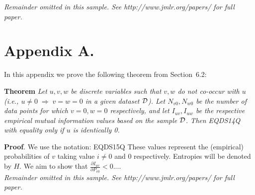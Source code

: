 \documentclass[twoside,11pt]{article}
\begin{document}
{\noindent \em Remainder omitted in this sample. See http://www.jmlr.org/papers/ for full paper.}


\newpage

\appendix
\section*{Appendix A.}
\label{app:theorem}

In this appendix we prove the following theorem from
Section~6.2:

\noindent
{\bf Theorem} {\it Let $u,v,w$ be discrete variables such that $v, w$ do
not co-occur with $u$ (i.e., $u\neq0\;\Rightarrow \;v=w=0$ in a given
dataset ${{\cal D}}$). Let $N_{v0},N_{w0}$ be the number of data points for
which $v=0, w=0$ respectively, and let $I_{uv},I_{uw}$ be the
respective empirical mutual information values based on the sample
${{\cal D}}$. Then
EQDS14Q
with equality only if $u$ is identically 0.} \hfill\BlackBox

\noindent
{\bf Proof}. We use the notation:
EQDS15Q
These values represent the (empirical) probabilities of $v$
taking value $i\neq 0$ and 0 respectively.  Entropies will be denoted
by $H$. We aim to show that ${\frac{\partial {I_{uv}}}{\partial  {P_{v0}}}} < 0$....\\

{\noindent \em Remainder omitted in this sample. See http://www.jmlr.org/papers/ for full paper.}

\vskip 0.2in

\end{document}

